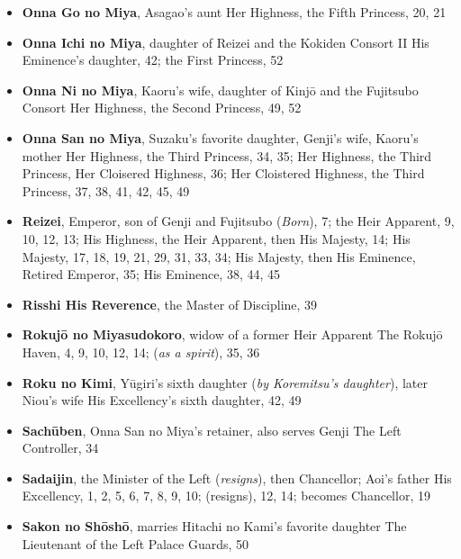 \documentclass{article}
\begin{document}
\begin{multicols}{2}
\begin{itemize}[
			label=,
			leftmargin=0em,
			rightmargin=-1.5em,
			itemindent=-2em,
			nosep,
		]
		\item \textbf{Onna Go no Miya}, Asagao's aunt Her Highness, the Fifth Princess, 20, 21

		\item \textbf{Onna Ichi no Miya}, daughter of Reizei and the Kokiden Consort II His Eminence's daughter, 42;
		      the First Princess, 52

		\item \textbf{Onna Ni no Miya}, Kaoru's wife, daughter of Kinjō and the Fujitsubo Consort Her Highness, the Second Princess, 49, 52

		\item \textbf{Onna San no Miya}, Suzaku's favorite daughter, Genji's wife, Kaoru's mother Her Highness, the Third Princess, 34, 35;
		      Her Highness, the Third Princess, Her Cloisered Highness, 36;
		      Her Cloistered Highness, the Third Princess, 37, 38, 41, 42, 45, 49

		\item \textbf{Reizei}, Emperor, son of Genji and Fujitsubo (\textit{Born}), 7;
		      the Heir Apparent, 9, 10, 12, 13;
		      His Highness, the Heir Apparent, then His Majesty, 14;
		      His Majesty, 17, 18, 19, 21, 29, 31, 33, 34;
		      His Majesty, then His Eminence, Retired Emperor, 35;
		      His Eminence, 38, 44, 45

		\item \textbf{Risshi His Reverence}, the Master of Discipline, 39

		\item \textbf{Rokujō no Miyasudokoro}, widow of a former Heir Apparent The Rokujō Haven, 4, 9, 10, 12, 14; (\textit{as a spirit}), 35, 36

		\item \textbf{Roku no Kimi}, Yūgiri's sixth daughter (\textit{by Koremitsu's daughter}), later Niou's wife His Excellency's sixth daughter, 42, 49

		\item \textbf{Sachūben}, Onna San no Miya's retainer, also serves Genji The Left Controller, 34

		\item \textbf{Sadaijin}, the Minister of the Left (\textit{resigns}), then Chancellor; Aoi's father His Excellency, 1, 2, 5, 6, 7, 8, 9, 10; (resigns), 12, 14;
		      becomes Chancellor, 19

		\item \textbf{Sakon no Shōshō}, marries Hitachi no Kami's favorite daughter The Lieutenant of the Left Palace Guards, 50


\end{itemize}
\end{multicols}
\end{document}
